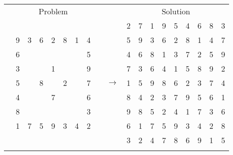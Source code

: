 \documentclass{article}
\begin{document}
\begin{tabular}{||c|c|c||c|c|c||c|c|c|| c ||c|c|c||c|c|c||c|c|c||}
  \cmidrule{1-9} \cmidrule{11-19}
  \multicolumn{9}{|c|}{Problem} &                   & \multicolumn{9}{|c|}{Solution}   \\\cmidrule{1-9} \cmidrule{11-19} \morecmidrules \cmidrule{1-9} \cmidrule{11-19}
   &   &   &   &   &   &   &   &   &               & 2 & 7 & 1 & 9 & 5 & 4 & 6 & 8 & 3\\\cmidrule{1-9} \cmidrule{11-19}
   & 9 & 3 & 6 & 2 & 8 & 1 & 4 &   &               & 5 & 9 & 3 & 6 & 2 & 8 & 1 & 4 & 7\\\cmidrule{1-9} \cmidrule{11-19}
   & 6 &   &   &   &   &   & 5 &   &               & 4 & 6 & 8 & 1 & 3 & 7 & 2 & 5 & 9\\\cmidrule{1-9} \cmidrule{11-19} \morecmidrules \cmidrule{1-9} \cmidrule{11-19}
   & 3 &   &   & 1 &   &   & 9 &   &               & 7 & 3 & 6 & 4 & 1 & 5 & 8 & 9 & 2\\\cmidrule{1-9} \cmidrule{11-19}
   & 5 &   & 8 &   & 2 &   & 7 &   & $\rightarrow$ & 1 & 5 & 9 & 8 & 6 & 2 & 3 & 7 & 4\\\cmidrule{1-9} \cmidrule{11-19}
   & 4 &   &   & 7 &   &   & 6 &   &               & 8 & 4 & 2 & 3 & 7 & 9 & 5 & 6 & 1\\\cmidrule{1-9} \cmidrule{11-19} \morecmidrules \cmidrule{1-9} \cmidrule{11-19}
   & 8 &   &   &   &   &   & 3 &   &               & 9 & 8 & 5 & 2 & 4 & 1 & 7 & 3 & 6\\\cmidrule{1-9} \cmidrule{11-19}
   & 1 & 7 & 5 & 9 & 3 & 4 & 2 &   &               & 6 & 1 & 7 & 5 & 9 & 3 & 4 & 2 & 8\\\cmidrule{1-9} \cmidrule{11-19}
   &   &   &   &   &   &   &   &   &               & 3 & 2 & 4 & 7 & 8 & 6 & 9 & 1 & 5\\\cmidrule{1-9} \cmidrule{11-19} \morecmidrules \cmidrule{1-9} \cmidrule{11-19}

 \end{tabular}
\\
\end{document}
